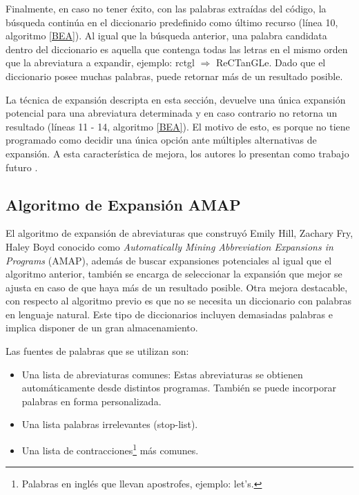 Finalmente, en caso no tener éxito, con las palabras extraídas del código, la búsqueda continúa en el diccionario predefinido como último recurso (línea 10, algoritmo \ref{BEA}). Al igual que la búsqueda anterior, una palabra candidata dentro del diccionario es aquella que contenga todas las letras en el mismo orden que la abreviatura a expandir, ejemplo: \mbox{\textsf{rctgl}} $\Rightarrow$ R\textsf{e}CT\textsf{an}GL\textsf{e}. Dado que el diccionario posee muchas palabras, puede retornar más de un resultado posible.

La técnica de expansión descripta en esta sección, devuelve una única expansión potencial para una abreviatura determinada y en caso contrario no retorna un resultado (líneas 11 - 14, algoritmo \ref{BEA}). El motivo de esto, es porque no tiene programado como decidir una única opción ante múltiples alternativas de expansión. A esta característica de mejora, los autores lo presentan como trabajo futuro \cite{LFBEX07,EZH08}.

\subsection{Algoritmo de Expansión AMAP}
\label{sec:algAmap}

El algoritmo de expansión de abreviaturas que construyó Emily Hill, Zachary Fry, Haley Boyd \cite{EZH08} conocido como \textit{Automatically Mining Abbreviation Expansions in Programs} (AMAP), además de buscar expansiones potenciales al igual que el algoritmo anterior, también se encarga de seleccionar la expansión que mejor se ajusta en caso de que haya más de un resultado posible. Otra mejora destacable, con respecto al algoritmo previo es que no se necesita un diccionario con palabras en lenguaje natural. Este tipo de diccionarios incluyen demasiadas palabras e implica disponer de un gran almacenamiento. 

Las fuentes de palabras que se utilizan son:
\begin{itemize}
\itemsep0em%
\item Una lista de abreviaturas comunes: Estas abreviaturas se obtienen automáticamente desde distintos programas. También se puede incorporar palabras en forma personalizada.
\item Una lista palabras irrelevantes (stop-list).
\item Una lista de contracciones\footnote[1]{Palabras en inglés que llevan apostrofes, ejemplo: let's.} más comunes.
\end{itemize}

